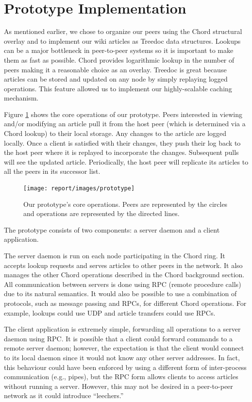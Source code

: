 \documentclass[twocolumn]{article}
\begin{document}
\section{Prototype Implementation}
As mentioned earlier, we chose to organize our peers using the Chord structural overlay and to implement our wiki articles as Treedoc data structures. Lookups can be a major bottleneck in peer-to-peer systems so it is important to make them as fast as possible. Chord provides logarithmic lookup in the number of peers making it a reasonable choice as an overlay. Treedoc is great because articles can be stored and updated on any node by simply replaying logged operations. This feature allowed us to implement our highly-scalable caching mechanism.

Figure \ref{fig:prototype} shows the core operations of our prototype. Peers interested in viewing and/or modifying an article pull it from the host peer (which is determined via a Chord lookup) to their local storage. Any changes to the article are logged locally. Once a client is satisfied with their changes, they push their log back to the host peer where it is replayed to incorporate the changes. Subsequent pulls will see the updated article. Periodically, the host peer will replicate its articles to all the peers in its successor list.

\begin{figure}[tbh!]
  \centering
  \texttt{[image: report/images/prototype]}
  \caption{Our prototype's core operations. Peers are represented by the circles and operations are represented by the directed lines. \label{fig:prototype}}
\end{figure}

The prototype consists of two components: a server daemon and a client application.

The server daemon is run on each node participating in the Chord ring. It accepts lookup requests and serves articles to other peers in the network. It also manages the other Chord operations described in the Chord background section. All communication between servers is done using RPC (remote procedure calls) due to its natural semantics. It would also be possible to use a combination of protocols, such as message passing and RPCs, for different Chord operations. For example, lookups could use UDP and article transfers could use RPCs.

The client application is extremely simple, forwarding all operations to a server daemon using RPC. It is possible that a client could forward commands to a remote server daemon; however, the expectation is that the client would connect to its local daemon since it would not know any other server addresses. In fact, this behaviour could have been enforced by using a different form of inter-process communication (e.g., pipes), but the RPC form allows clients to access articles without running a server. However, this may not be desired in a peer-to-peer network as it could introduce \enquote{leechers.}
\end{document}

